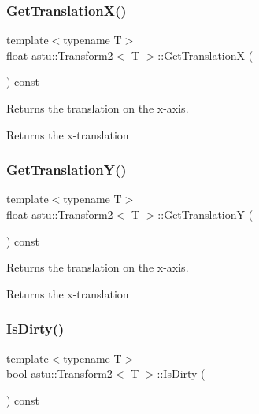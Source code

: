 \subsubsection{\texorpdfstring{Get\+Translation\+X()}{GetTranslationX()}}
{\footnotesize\ttfamily template$<$typename T$>$ \\
float \hyperlink{classastu_1_1Transform2}{astu\+::\+Transform2}$<$ T $>$\+::Get\+TranslationX (\begin{DoxyParamCaption}{ }\end{DoxyParamCaption}) const\hspace{0.3cm}{\ttfamily [inline]}}

Returns the translation on the x-\/axis.

\begin{DoxyReturn}{Returns}
the x-\/translation 
\end{DoxyReturn}
\mbox{\label{classastu_1_1Transform2_a731d0cb4c4a249b5f42a672f42b04a3b}} 
\subsubsection{\texorpdfstring{Get\+Translation\+Y()}{GetTranslationY()}}
{\footnotesize\ttfamily template$<$typename T$>$ \\
float \hyperlink{classastu_1_1Transform2}{astu\+::\+Transform2}$<$ T $>$\+::Get\+TranslationY (\begin{DoxyParamCaption}{ }\end{DoxyParamCaption}) const\hspace{0.3cm}{\ttfamily [inline]}}

Returns the translation on the x-\/axis.

\begin{DoxyReturn}{Returns}
the x-\/translation 
\end{DoxyReturn}
\mbox{\label{classastu_1_1Transform2_a935f5e7fb268157b770fc315c7c660ea}} 
\subsubsection{\texorpdfstring{Is\+Dirty()}{IsDirty()}}
{\footnotesize\ttfamily template$<$typename T$>$ \\
bool \hyperlink{classastu_1_1Transform2}{astu\+::\+Transform2}$<$ T $>$\+::Is\+Dirty (\begin{DoxyParamCaption}{ }\end{DoxyParamCaption}) const\hspace{0.3cm}{\ttfamily [inline]}}

